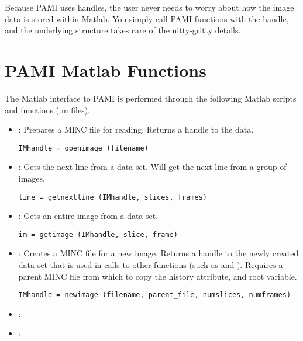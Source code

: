Because PAMI uses handles, the user never needs to worry about how the image
data is stored within Matlab.  You simply call PAMI functions with the handle,
and the underlying structure takes care of the nitty-gritty details.


\newpage
\section{PAMI Matlab Functions}

The Matlab interface to PAMI is performed through the following
Matlab scripts and functions (.m files).


\begin{itemize}

\item {} : Prepares a MINC file for reading.  Returns a handle to the data.
\begin{verbatim}
IMhandle = openimage (filename)
\end{verbatim}

\item {} : Gets the next line from a data set.  Will get the next line from a
    group of images.
\begin{verbatim}
line = getnextline (IMhandle, slices, frames)
\end{verbatim}

\item {} : Gets an entire image from a data set.
\begin{verbatim}
im = getimage (IMhandle, slice, frame)
\end{verbatim}

\item {} : Creates a MINC file for a new image.  Returns a handle
    to the newly created data set that is used in calls to other functions
    (such as  and ).  Requires a parent
    MINC file from which to copy the history attribute, and root variable.
\begin{verbatim}
IMhandle = newimage (filename, parent_file, numslices, numframes)
\end{verbatim}

\item {} :

\item {} :


\end{itemize}
